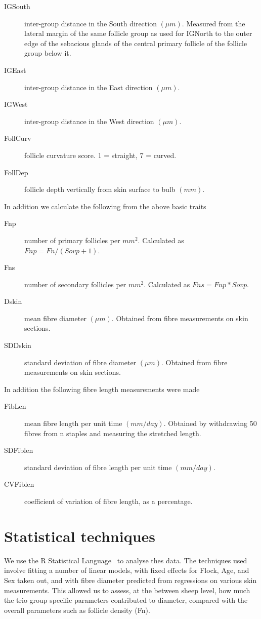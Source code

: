 \documentclass[titlepage]{article}  %
\begin{document}
\begin{description}
\item[IGSouth] inter-group distance in the South direction $(\mu m)$. Measured from the lateral margin of the same follicle group as used for IGNorth to the outer edge of the sebacious glands of the central primary follicle of the follicle group below it.
\item[IGEast] inter-group distance in the East direction $(\mu m)$.
\item[IGWest] inter-group distance in the West direction $(\mu m)$.
\item[FollCurv] follicle curvature score. 1 = straight, 7 = curved.
\item[FollDep] follicle depth vertically from skin surface to bulb $(mm)$.

\end{description}
 In addition we calculate the following from the above basic traits
\begin{description}
\item[Fnp] number of primary follicles per $mm^2$. Calculated as $Fnp = Fn/(Sovp + 1)$.
\item[Fns] number of secondary follicles per $mm^2$. Calculated as $Fns = Fnp * Sovp$.
\item[Dskin] mean fibre diameter $(\mu m)$. Obtained from fibre measurements on skin sections.
\item[SDDskin] standard deviation of fibre diameter $(\mu m)$. Obtained from fibre measurements on skin sections.
\end{description}
 In addition the following fibre length measurements were made
\begin{description}
\item[FibLen] mean fibre length per unit time $(mm/day)$. Obtained by withdrawing 50 fibres from n staples and measuring the stretched length.
\item[SDFiblen] standard deviation of fibre length per unit time $(mm/day)$.
\item[CVFiblen] coefficient of variation of fibre length, as a percentage.
\end{description}



\section{Statistical techniques}
We use the R Statistical Language~\cite{rprog:13} to analyse thes data. The techniques used involve fitting a number of linear models, with fixed effects for Flock, Age, and Sex taken out, and with fibre diameter predicted from regressions on various skin measurements. This allowed us to assess, at the between sheep level, how much the trio group specific parameters contributed to diameter, compared with the overall parameters such as follicle density (Fn). 
\end{document}
